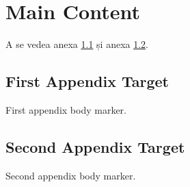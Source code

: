 \documentclass[a4paper,12pt]{report}
\begin{document}
\tableofcontents
\clearpage
\chapter{Main Content}
A se vedea anexa \ref{appendix:first} și anexa \ref{appendix:second}.

\appendixChapter
\section{First Appendix Target}\label{appendix:first}
First appendix body marker.

\section{Second Appendix Target}\label{appendix:second}
Second appendix body marker.
\end{document}
